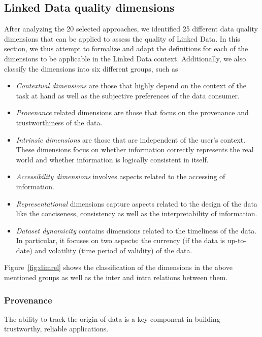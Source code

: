 \subsection{Linked Data quality dimensions}
\label{sec:dimensions}
After analyzing the 20 selected approaches, we identified 25 different data quality dimensions that can be applied to assess the quality of Linked Data. 
In this section, we thus attempt to formalize and adapt the definitions for each of the dimensions to be applicable in the Linked Data context.
Additionally, we also classify the dimensions into six different groups, such as
\begin{itemize}
\item \textit{Contextual dimensions} are those that highly depend on the context of the task at hand as well as the subjective preferences of the data consumer.
\item \textit{Provenance} related dimensions are those that focus on the provenance and trustworthiness of the data.
\item \textit{Intrinsic dimensions} are those that are independent of the user's context. 
These dimensions focus on whether information correctly represents the real world and whether
information is logically consistent in itself.
\item \textit{Accessibility dimensions} involves aspects related to the accessing of information.
\item \textit{Representational} dimensions capture aspects related to the design of the data like the conciseness, consistency as well as the interpretability of information.
\item \textit{Dataset dynamicity} contains dimensions related to the timeliness of the data. 
In particular, it focuses on two aspects: the currency (if the data is up-to-date) and volatility (time period of validity) of the data.
\end{itemize}

Figure~\ref{fig:dimrel} shows the classification of the dimensions in the above mentioned groups as well as the inter and intra relations between them.

\subsubsection{Provenance}
The ability to track the origin of data is a key component in building trustworthy, reliable applications.

